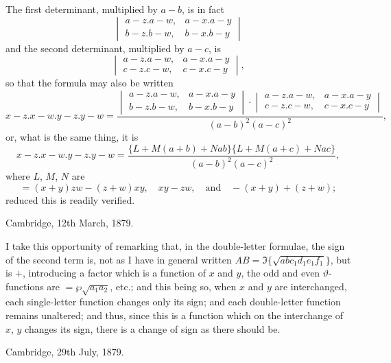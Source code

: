 \documentclass[12pt,a4paper]{article}
\theoremstyle{definition}
\begin{document}
The first determinant, multiplied by $a - b$, is in fact
\[
\begin{vmatrix} a - z . a - w, & a - x . a - y \\ b - z . b - w, & b - x . b - y \end{vmatrix}
\]
and the second determinant, multiplied by $a - c$, is
\[
\begin{vmatrix} a - z . a - w, & a - x . a - y \\ c - z . c - w, & c - x . c - y \end{vmatrix},
\]
so that the formula may also be written
\[
x - z . x - w . y - z . y - w = \frac{\begin{vmatrix} a - z . a - w, & a - x . a - y \\ b - z . b - w, & b - x . b - y \end{vmatrix} \cdot \begin{vmatrix} a - z . a - w, & a - x . a - y \\ c - z . c - w, & c - x . c - y \end{vmatrix}}{(a - b)^2 (a - c)^2},
\]
or, what is the same thing, it is
\[
x - z . x - w . y - z . y - w = \frac{\{L + M(a + b) + Nab\}\{L + M(a + c) + Nac\}}{(a - b)^2 (a - c)^2},
\]
where $L$, $M$, $N$ are
\[
= (x + y)zw - (z + w)xy,\quad xy - zw,\quad \text{and}\quad -(x + y) + (z + w);
\]
reduced this is readily verified.

\vspace{1em}

\begin{flushright}
Cambridge, 12th March, 1879.
\end{flushright}

\vspace{1em}

I take this opportunity of remarking that, in the double-letter formulae, the sign of the second term is, not as I have in general written $AB = \Im\{\sqrt{abc_1 d_1 e_1 f_1}\}$, but is $+$, introducing a factor which is a function of $x$ and $y$, the odd and even $\vartheta$-functions are $= \wp\sqrt{a_1 a_2}$, etc.; and this being so, when $x$ and $y$ are interchanged, each single-letter function changes only its sign; and each double-letter function remains unaltered; and thus, since this is a function which on the interchange of $x$, $y$ changes its sign, there is a change of sign as there should be.

\vspace{1em}

\begin{flushright}
Cambridge, 29th July, 1879.
\end{flushright}
\end{document}
